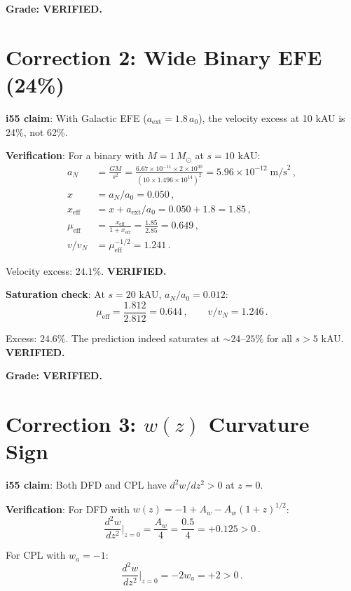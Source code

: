 \documentclass[11pt,a4paper]{article}
\begin{document}
\textbf{Grade: VERIFIED.}

\section{Correction 2: Wide Binary EFE (24\%)}

\textbf{i55 claim}: With Galactic EFE ($a_{\mathrm{ext}} = 1.8\,a_0$), the velocity excess at 10 kAU is 24\%, not 62\%.

\textbf{Verification}: For a binary with $M = 1\,M_\odot$ at $s = 10$ kAU:
\begin{align}
a_N &= \frac{GM}{s^2} = \frac{6.67 \times 10^{-11} \times 2 \times 10^{30}}{(10 \times 1.496 \times 10^{14})^2} = 5.96 \times 10^{-12}\;\text{m/s}^2\,, \\
x &= a_N / a_0 = 0.050\,, \\
x_{\mathrm{eff}} &= x + a_{\mathrm{ext}}/a_0 = 0.050 + 1.8 = 1.85\,, \\
\mu_{\mathrm{eff}} &= \frac{x_{\mathrm{eff}}}{1 + x_{\mathrm{eff}}} = \frac{1.85}{2.85} = 0.649\,, \\
v/v_N &= \mu_{\mathrm{eff}}^{-1/2} = 1.241\,.
\end{align}

Velocity excess: $24.1\%$. \textbf{VERIFIED.}

\textbf{Saturation check}: At $s = 20$ kAU, $a_N/a_0 = 0.012$:
\begin{equation}
\mu_{\mathrm{eff}} = \frac{1.812}{2.812} = 0.644\,,\qquad v/v_N = 1.246\,.
\end{equation}

Excess: $24.6\%$. The prediction indeed saturates at $\sim 24$--$25\%$ for all $s > 5$ kAU. \textbf{VERIFIED.}

\textbf{Grade: VERIFIED.}

\section{Correction 3: $w(z)$ Curvature Sign}

\textbf{i55 claim}: Both DFD and CPL have $d^2w/dz^2 > 0$ at $z = 0$.

\textbf{Verification}: For DFD with $w(z) = -1 + A_w - A_w(1+z)^{1/2}$:
\begin{equation}
\frac{d^2w}{dz^2}\bigg|_{z=0} = \frac{A_w}{4} = \frac{0.5}{4} = +0.125 > 0\,.
\end{equation}

For CPL with $w_a = -1$:
\begin{equation}
\frac{d^2w}{dz^2}\bigg|_{z=0} = -2w_a = +2 > 0\,.
\end{equation}
\end{document}
